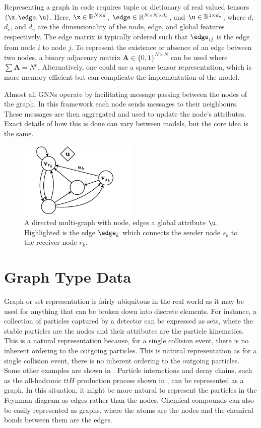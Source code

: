 Representing a graph in code requires tuple or dictionary of real valued tensors $(\x, \edge, \u)$.
Here, $\x \in \mathbb{R}^{N \times d}$, $\edge \in \mathbb{R}^{N \times N \times d_e}$, and $\u \in \mathbb{R}^{1 \times d_u}$, where $d$, $d_e$, and $d_u$ are the dimensionality of the node, edge, and global features respectively.
The edge matrix is typically ordered such that $\edge_{ij}$ is the edge from node $i$ to node $j$.
To represent the existence or absence of an edge between two nodes, a binary adjacency matrix $\mathbf{A} \in \{0, 1\}^{N \times N}$ can be used where $\sum{\mathbf{A}} = N^e$.
Alternatively, one could use a sparse tensor representation, which is more memory efficient but can complicate the implementation of the model.

Almost all GNNs operate by facilitating message passing between the nodes of the graph.
In this framework each node sends messages to their neighbours.
These messages are then aggregated and used to update the node's attributes.
Exact details of how this is done can vary between models, but the core idea is the same.

\begin{figure}
    \centering
    \includegraphics[width=0.5\textwidth]{Figures/graph_networks/graphs.pdf}
    \caption{A directed multi-graph with node, edges a global attribute $\u$. Highlighted is the edge $\edge_{k}$ which connects the sender node $s_k$ to the receiver node $r_k$.}
    \label{fig:graph}
\end{figure}

\section{Graph Type Data}
\label{sec:graph_data}

Graph or set representation is fairly ubiquitous in the real world as it may be used for anything that can be broken down into discrete elements.
For instance, a collection of particles captured by a detector can be expressed as sets, where the stable particles are the nodes and their attributes are the particle kinematics.
This is a natural representation because, for a single collision event, there is no inherent ordering to the outgoing particles.
This is natural representation as for a single collision event, there is no inherent ordering to the outgoing particles.
Some other examples are shown in .
Particle interactions and decay chains, such as the all-hadronic $ttH$ production process shown in , can be represented as a graph.
In this situation, it might be more natural to represent the particles in the Feynman diagram as edges rather than the nodes.
Chemical compounds can also be easily represented as graphs, where the atoms are the nodes and the chemical bonds between them are the edges.

